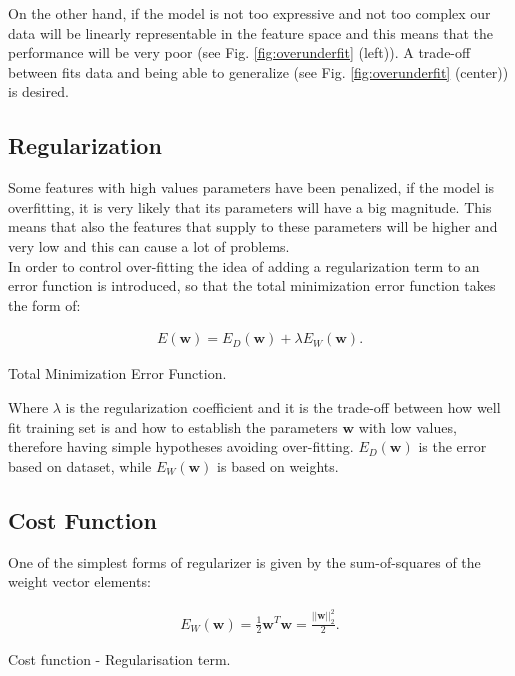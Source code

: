 \noindent On the other hand, if the model is not too expressive and not too complex our data will be linearly representable in the feature space and this means that the performance will be very poor (see Fig. \ref{fig:overunderfit} (left)). A trade-off between fits data and being able to generalize (see Fig. \ref{fig:overunderfit} (center)) is desired.

\subsection{Regularization}
Some features with high values parameters have been penalized, if the model is overfitting, it is very likely that its parameters will have a big magnitude. This means that also the features that supply to these parameters will be higher and very low and this can cause a lot of problems. \\

\noindent In order to control over-fitting the idea of adding a regularization term to an error function is introduced, so that the total minimization error function takes the form of:

\begin{Equation}[H]
	\centering
	\begin{equation} \label{eq:fullreg}
		\begin{aligned}
			E(\bm{w}) = E_D(\bm{w}) + \lambda E_W(\bm{w}) .
		\end{aligned}
	\end{equation}
	\caption[Total Minimization Error Function.]{Total Minimization Error Function.}
\end{Equation}

\noindent Where $\lambda$ is the regularization coefficient and it is the trade-off between how well fit training set is and how to establish the parameters $\bm{w}$ with low values, therefore having simple hypotheses avoiding over-fitting. $E_D(\bm{w})$ is the error based on dataset, while $E_W(\bm{w})$ is based on weights.

\subsection{Cost Function}
\label{subsec:regcostfun}

One of the simplest forms of regularizer is given by the sum-of-squares of the weight vector elements:
\begin{Equation}[H]
	\centering
	\begin{equation}\label{eq:regularizer}
		\begin{aligned}
			E_W(\bm{w}) = \frac{1}{2} \bm{w}^T \bm{w} = \frac{||\bm{w}||^2_2}{2} .
		\end{aligned}
	\end{equation}
	\caption[Cost function - Regularisation term.]{Cost function - Regularisation term.}
\end{Equation}

